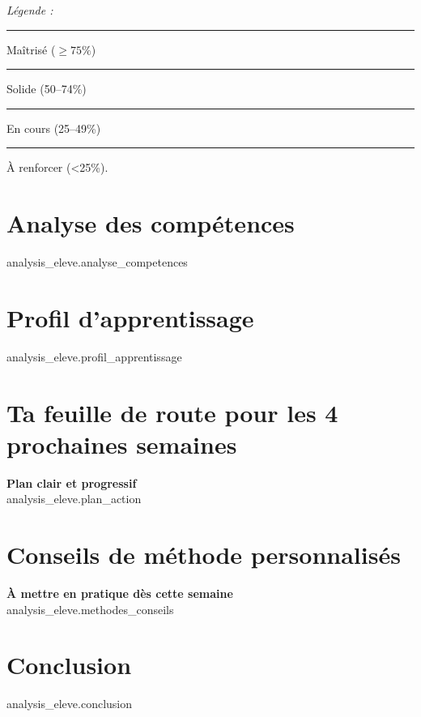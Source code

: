 \documentclass[12pt,a4paper]{article}
\begin{document}
\vspace{0.3em}
\small\textit{Légende :}
\textcolor{ForestGreen}{\rule{0.4cm}{0.4cm}} Maîtrisé (\(\ge 75\%\)) \quad
\textcolor{PMFBlue}{\rule{0.4cm}{0.4cm}} Solide (50–74\%) \quad
\textcolor{Orange}{\rule{0.4cm}{0.4cm}} En cours (25–49\%) \quad
\textcolor{Red}{\rule{0.4cm}{0.4cm}} À renforcer (<25\%).

\vspace{0.6em}
\section*{Analyse des compétences}
{{analysis_eleve.analyse_competences}}

\vspace{0.6em}
\section*{Profil d’apprentissage}
{{analysis_eleve.profil_apprentissage}}

\vspace{0.6em}
\section*{Ta feuille de route pour les 4 prochaines semaines}
\begin{bluebox}
\textbf{Plan clair et progressif}\\
{{analysis_eleve.plan_action}}
\end{bluebox}

\vspace{0.6em}
\section*{Conseils de méthode personnalisés}
\begin{bluebox}
\textbf{À mettre en pratique dès cette semaine}\\
{{analysis_eleve.methodes_conseils}}
\end{bluebox}

\vspace{0.6em}
\section*{Conclusion}
{{analysis_eleve.conclusion}}

\end{document}

